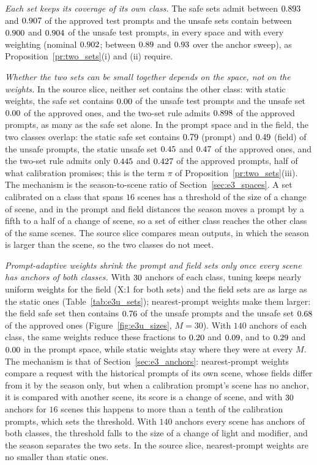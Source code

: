 \documentclass{article}
\theoremstyle{plain}
\theoremstyle{remark}
\begin{document}
\emph{Each set keeps its coverage of its own class.} The safe sets admit between $0.893$ and $0.907$ of the approved test
prompts and the unsafe sets contain between $0.900$ and $0.904$ of the unsafe test prompts, in every space and with every
weighting (nominal $0.902$; between $0.89$ and $0.93$ over the anchor sweep), as Proposition~\ref{pr:two_sets}(i) and
(ii) require.

\emph{Whether the two sets can be small together depends on the space, not on the weights.} In the source slice, neither set contains
the other class: with static weights, the safe set contains $0.00$ of the unsafe test prompts and the unsafe set $0.00$
of the approved ones, and the two-set rule admits $0.898$ of the approved prompts, as many as the safe set alone. In the prompt
space and in the field, the two classes overlap: the static safe set contains $0.79$ (prompt) and $0.49$ (field) of the
unsafe prompts, the static unsafe set $0.45$ and $0.47$ of the approved ones, and the two-set rule admits only
$0.445$ and $0.427$ of the approved prompts, half of what calibration promises; this is the term $\pi$ of
Proposition~\ref{pr:two_sets}(iii). The mechanism is the season-to-scene ratio of Section~\ref{sec:e3_spaces}. A set calibrated on a class
that spans $16$ scenes has a threshold of the size of a change of scene, and in the prompt and field distances the season moves a prompt
by a fifth to a half of a change of scene, so a set of either class reaches the other class of the same scenes. The source slice
compares mean outputs, in which the season is larger than the scene, so the two classes do not meet.

\emph{Prompt-adaptive weights shrink the prompt and field sets only once every scene has anchors of both classes.} With $30$ anchors of
each class, tuning keeps nearly uniform weights for the field (X:1 for both sets) and the field sets are as large as the static ones
(Table~\ref{tab:e3u_sets}); nearest-prompt weights make them larger: the field safe set then contains $0.76$ of the unsafe
prompts and the unsafe set $0.68$ of the approved ones (Figure~\ref{fig:e3u_sizes}, $M=30$). With $140$ anchors of each
class, the same weights reduce these fractions to $0.20$ and $0.09$, and to $0.29$ and
$0.00$ in the prompt space, while static weights stay where they were at every $M$. The mechanism is that of
Section~\ref{sec:e3_anchors}: nearest-prompt weights compare a request with the historical prompts of its own scene, whose fields differ
from it by the season only, but when a calibration prompt's scene has no anchor, it is compared with another scene, its score is a
change of scene, and with $30$ anchors for $16$ scenes this happens to more than a tenth of the calibration prompts, which sets the
threshold. With $140$ anchors every scene has anchors of both classes, the threshold falls to the size of a change of light and
modifier, and the season separates the two sets. In the source slice, nearest-prompt weights are no smaller than static ones.
\end{document}
